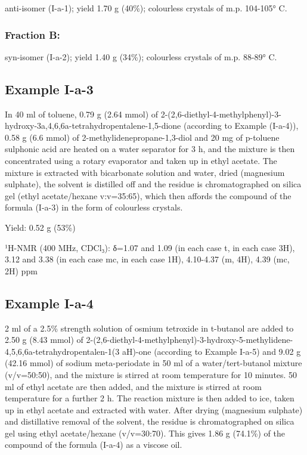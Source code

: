 \documentclass[11pt,a4paper]{article}
\begin{document}
anti-isomer (I-a-1); yield 1.70 g (40\%); colourless crystals of m.p. 104-105° C.

\subsubsection{Fraction B:}

syn-isomer (I-a-2); yield 1.40 g (34\%); colourless crystals of m.p. 88-89° C.

\subsection{Example I-a-3}

In 40 ml of toluene, 0.79 g (2.64 mmol) of 2-(2,6-diethyl-4-methylphenyl)-3-hydroxy-3a,4,6,6a-tetrahydropentalene-1,5-dione (according to Example (I-a-4)), 0.58 g (6.6 mmol) of 2-methylidenepropane-1,3-diol and 20 mg of p-toluene sulphonic acid are heated on a water separator for 3 h, and the mixture is then concentrated using a rotary evaporator and taken up in ethyl acetate. The mixture is extracted with bicarbonate solution and water, dried (magnesium sulphate), the solvent is distilled off and the residue is chromatographed on silica gel (ethyl acetate/hexane v:v=35:65), which then affords the compound of the formula (I-a-3) in the form of colourless crystals.

Yield: 0.52 g (53\%)

¹H-NMR (400 MHz, CDCl₃): δ=1.07 and 1.09 (in each case t, in each case 3H), 3.12 and 3.38 (in each case mc, in each case 1H), 4.10-4.37 (m, 4H), 4.39 (mc, 2H) ppm

\subsection{Example I-a-4}

2 ml of a 2.5\% strength solution of osmium tetroxide in t-butanol are added to 2.50 g (8.43 mmol) of 2-(2,6-diethyl-4-methylphenyl)-3-hydroxy-5-methylidene-4,5,6,6a-tetrahydropentalen-1(3 aH)-one (according to Example I-a-5) and 9.02 g (42.16 mmol) of sodium meta-periodate in 50 ml of a water/tert-butanol mixture (v/v=50:50), and the mixture is stirred at room temperature for 10 minutes. 50 ml of ethyl acetate are then added, and the mixture is stirred at room temperature for a further 2 h. The reaction mixture is then added to ice, taken up in ethyl acetate and extracted with water. After drying (magnesium sulphate) and distillative removal of the solvent, the residue is chromatographed on silica gel using ethyl acetate/hexane (v/v=30:70). This gives 1.86 g (74.1\%) of the compound of the formula (I-a-4) as a viscose oil.
\end{document}

